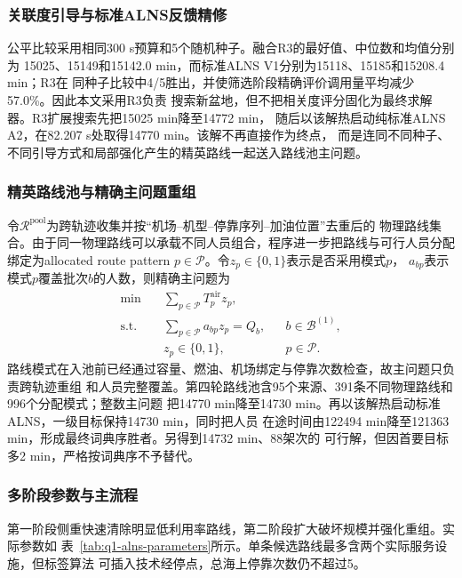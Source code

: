 \documentclass[UTF8,a4paper,zihao=5]{ctexart}
\begin{document}
\subsubsection{关联度引导与标准ALNS反馈精修}

公平比较采用相同300 s预算和5个随机种子。融合R3的最好值、中位数和均值分别为
15025、15149和15142.0 min，而标准ALNS V1分别为15118、15185和15208.4 min；R3在
同种子比较中4/5胜出，并使筛选阶段精确评价调用量平均减少57.0\%。因此本文采用R3负责
搜索新盆地，但不把相关度评分固化为最终求解器。R3扩展搜索先把15025 min降至14772 min，
随后以该解热启动纯标准ALNS A2，在82.207 s处取得14770 min。该解不再直接作为终点，
而是连同不同种子、不同引导方式和局部强化产生的精英路线一起送入路线池主问题。

\subsubsection{精英路线池与精确主问题重组}

令$\mathcal R^{\mathrm{pool}}$为跨轨迹收集并按“机场--机型--停靠序列--加油位置”去重后的
物理路线集合。由于同一物理路线可以承载不同人员组合，程序进一步把路线与可行人员分配
绑定为allocated route pattern $p\in\mathcal P$。令$z_p\in\{0,1\}$表示是否采用模式$p$，
$a_{bp}$表示模式$p$覆盖批次$b$的人数，则精确主问题为
\begin{align}
  \min\quad &\sum_{p\in\mathcal P}T_p^{\mathrm{air}}z_p,
  \label{eq:q1-pool-master-objective}\\
  \text{s.t.}\quad &\sum_{p\in\mathcal P}a_{bp}z_p=Q_b,
  &&b\in\mathcal B^{(1)},\label{eq:q1-pool-master-cover}\\
  &z_p\in\{0,1\},&&p\in\mathcal P.
\end{align}
路线模式在入池前已经通过容量、燃油、机场绑定与停靠次数检查，故主问题只负责跨轨迹重组
和人员完整覆盖。第四轮路线池含95个来源、391条不同物理路线和996个分配模式；整数主问题
把14770 min降至14730 min。再以该解热启动标准ALNS，一级目标保持14730 min，同时把人员
在途时间由122494 min降至121363 min，形成最终词典序胜者。另得到14732 min、88架次的
可行解，但因首要目标多2 min，严格按词典序不予替代。

\subsubsection{多阶段参数与主流程}

第一阶段侧重快速清除明显低利用率路线，第二阶段扩大破坏规模并强化重组。实际参数如
表~\ref{tab:q1-alns-parameters}所示。单条候选路线最多含两个实际服务设施，但标签算法
可插入技术经停点，总海上停靠次数仍不超过5。
\end{document}
